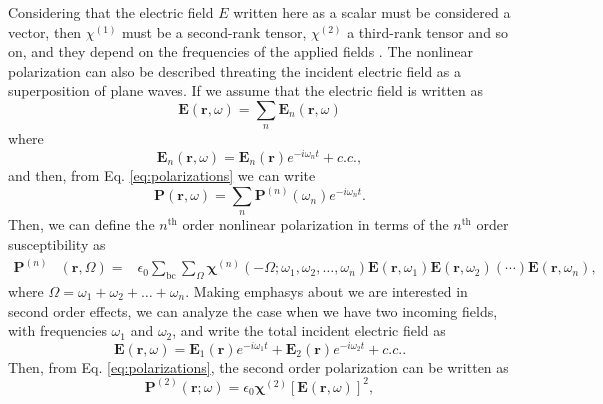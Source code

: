 Considering that the electric field $E$ written here as a scalar must be
considered a vector, then $\chi^{(1)}$ must be a second-rank tensor,
$\chi^{(2)}$ a third-rank tensor and so on, and they depend on the frequencies
of the applied fields \cite{boyd03book}. The nonlinear polarization can also be
described threating the incident electric field as a superposition of plane
waves. If we assume that the electric field is written as \cite{janner98PHDT}
\begin{equation}
\mathbf{E} (\mathbf{r},\omega) = 
\sum_{n} \mathbf{E}_{n} (\mathbf{r},\omega)
\label{eq:planar1}
\end{equation}
where
\begin{equation}
\mathbf{E}_{n} (\mathbf{r},\omega) = 
\mathbf{E}_{n} (\mathbf{r}) e^{-i\omega_{n} t} +  c.c.
,
\label{eq:planar2}
\end{equation}
and then, from Eq. \eqref{eq:polarizations} we can write 
\begin{equation}
\mathbf{P} (\mathbf{r},\omega) =
\sum_{n} \mathbf{P}^{(n)} (\omega_{n}) e^{-i\omega_{n}t}
.
\label{eq:vec-polarization}
\end{equation}
Then, we can define the $n^{\mathrm{th}}$ order nonlinear polarization in terms
of the $n^{\mathrm{th}}$ order susceptibility as
\begin{equation}
\begin{aligned}
\mathbf{P}^{(n)} & (\mathbf{r},\Omega) = 
&\epsilon_{0} \sum_{\mathrm{bc}} \sum_{\Omega} 
\boldsymbol{\chi}^{(n)}
\left(
-\Omega; \omega_{1}, \omega_{2}, \ldots, \omega_{n}
\right)
\mathbf{E}(\mathbf{r},\omega_{1}) \mathbf{E}(\mathbf{r},\omega_{2}) (\cdots) 
\mathbf{E}(\mathbf{r},\omega_{n})
,
\end{aligned}
\end{equation}
where $\Omega = \omega_{1} + \omega_{2} + \ldots + \omega_{n}$. Making emphasys
about we are interested in second order effects, we can analyze the case when
we have two incoming fields, with frequencies $\omega_ {1}$ and
$\omega_{2}$, and write the total incident electric field as
\cite{anderson16PHDT}
\begin{equation}
\mathbf{E}(\mathbf{r},\omega) = 
\mathbf{E}_{1}(\mathbf{r}) e^{-i\omega_{1}t} + 
\mathbf{E}_{2}(\mathbf{r}) e^{-i\omega_{2}t} + c.c.
. 
\label{eq:two-fields}
\end{equation}
Then, from Eq. \eqref{eq:polarizations}, the second order polarization can be
written as
\begin{equation}
\mathbf{P}^{(2)} (\mathbf{r};\omega) = 
\epsilon_{0} \boldsymbol{\chi}^{(2)} [\mathbf{E}(\mathbf{r},\omega)]^{2}
,
\label{eq:second-pol-1}
\end{equation}
